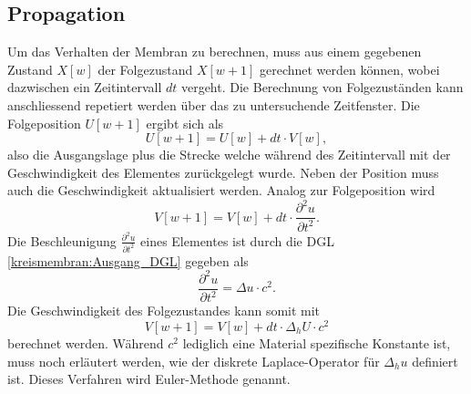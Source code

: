 \subsection{Propagation}
Um das Verhalten der Membran zu berechnen, muss aus einem gegebenen Zustand $ X[w] $ der Folgezustand $ X[w+1] $ gerechnet werden können, wobei dazwischen ein Zeitintervall $ dt $ vergeht. 
Die Berechnung von Folgezuständen kann anschliessend repetiert werden über das zu untersuchende Zeitfenster.
Die Folgeposition $ U[w+1] $ ergibt sich als 
\begin{equation}
	U[w+1] =  U[w] + dt \cdot V[w],
\end{equation} 
also die Ausgangslage plus die Strecke welche während des Zeitintervall mit der Geschwindigkeit des Elementes zurückgelegt wurde. 
Neben der Position muss auch die Geschwindigkeit aktualisiert werden.
Analog zur Folgeposition wird
\begin{equation*}
	V[w+1] = V[w] + dt \cdot \frac{\partial^2u}{\partial t^2}.
\end{equation*}    
Die Beschleunigung $ \frac{\partial^2u}{\partial t^2} $  eines Elementes ist durch die DGL \ref{kreismembran:Ausgang_DGL} gegeben als
\begin{equation*}
	\frac{\partial^2u}{\partial t^2} = \Delta u \cdot c^2.
\end{equation*}
Die Geschwindigkeit des Folgezustandes kann somit mit
\begin{equation}
	V[w+1] = V[w] + dt \cdot \Delta_h U \cdot c^2
\end{equation}
berechnet werden.
Während $ c^2 $ lediglich eine Material spezifische Konstante ist, muss noch erläutert werden, wie der diskrete Laplace-Operator für $ \Delta_h u $ definiert ist. Dieses Verfahren wird Euler-Methode genannt.


